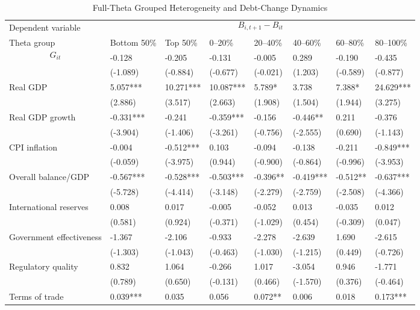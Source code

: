 \begin{table}[H]\centering
\begin{threeparttable}
\caption{Full-Theta Grouped Heterogeneity and Debt-Change Dynamics}
\label{tab:theta_group_heterogeneity_debt}
\scriptsize
\begin{tabularx}{\textwidth}{lYYYYYYY}
\toprule
Dependent variable &  \\
\cmidrule(lr){2-8}
Theta group & Bottom 50\% & Top 50\% & 0--20\% & 20--40\% & 40--60\% & 60--80\% & 80--100\% \\
\midrule
$$G_{it}$$ & -0.128 & -0.205 & -0.131 & -0.005 & 0.289 & -0.190 & -0.435 \\
  & (-1.089) & (-0.884) & (-0.677) & (-0.021) & (1.203) & (-0.589) & (-0.877) \\
Real GDP & 5.057*** & 10.271*** & 10.087*** & 5.789* & 3.738 & 7.388* & 24.629*** \\
  & (2.886) & (3.517) & (2.663) & (1.908) & (1.504) & (1.944) & (3.275) \\
Real GDP growth & -0.331*** & -0.241 & -0.359*** & -0.156 & -0.446** & 0.211 & -0.376 \\
  & (-3.904) & (-1.406) & (-3.261) & (-0.756) & (-2.555) & (0.690) & (-1.143) \\
CPI inflation & -0.004 & -0.512*** & 0.103 & -0.094 & -0.138 & -0.211 & -0.849*** \\
  & (-0.059) & (-3.975) & (0.944) & (-0.900) & (-0.864) & (-0.996) & (-3.953) \\
Overall balance/GDP & -0.567*** & -0.528*** & -0.503*** & -0.396** & -0.419*** & -0.512** & -0.637*** \\
  & (-5.728) & (-4.414) & (-3.148) & (-2.279) & (-2.759) & (-2.508) & (-4.366) \\
International reserves & 0.008 & 0.017 & -0.005 & -0.052 & 0.013 & -0.035 & 0.012 \\
  & (0.581) & (0.924) & (-0.371) & (-1.029) & (0.454) & (-0.309) & (0.047) \\
Government effectiveness & -1.367 & -2.106 & -0.933 & -2.278 & -2.639 & 1.690 & -2.615 \\
  & (-1.303) & (-1.043) & (-0.463) & (-1.030) & (-1.215) & (0.449) & (-0.726) \\
Regulatory quality & 0.832 & 1.064 & -0.266 & 1.017 & -3.054 & 0.946 & -1.771 \\
  & (0.789) & (0.650) & (-0.131) & (0.466) & (-1.570) & (0.376) & (-0.464) \\
Terms of trade & 0.039*** & 0.035 & 0.056 & 0.072** & 0.006 & 0.018 & 0.173*** \\

\end{tabularx}
\end{threeparttable}
\end{table}
